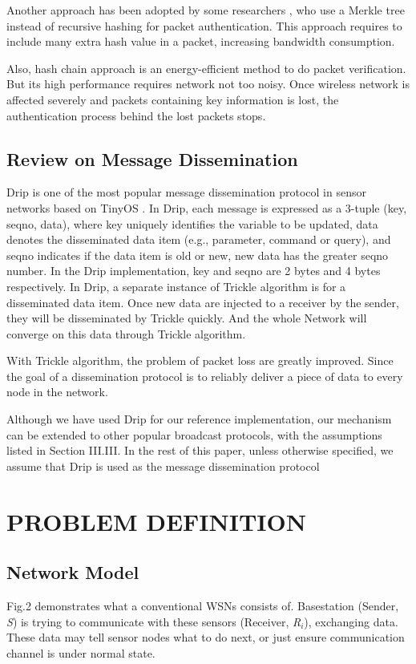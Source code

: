 \documentclass{sig-alternate-05-2015}
\begin{document}
Another approach has been adopted by some researchers \cite{hashtree} , who use a Merkle tree instead of recursive hashing for packet authentication. This approach requires to include many extra hash value in a packet, increasing bandwidth consumption.

Also, hash chain approach \cite{nested} is an energy-efficient method to do packet verification. But its high performance requires network not too noisy.  Once wireless network is affected severely and packets containing key information is lost, the authentication process behind the lost packets stops.
 
\subsection{Review on Message Dissemination}
Drip is one of the most popular message dissemination protocol in sensor networks based on TinyOS \cite{tinyos} . In Drip, each message is expressed as a 3-tuple (key, seqno, data), where key uniquely identifies the variable to be updated, data denotes the disseminated data item (e.g., parameter, command or query), and seqno indicates if the data item is old or new, new data has  the greater seqno number. In the Drip implementation, key and seqno are 2 bytes and 4 bytes respectively. In Drip, a separate instance of Trickle algorithm  \cite{trickle} is for a disseminated data item. Once new data are injected to a receiver by the sender, they will be disseminated by Trickle quickly. And the whole Network will converge on this data through Trickle algorithm. 

With Trickle algorithm, the problem of packet loss are greatly improved. Since the goal of a dissemination protocol is to reliably deliver a piece of data to every node in the network.
	
	Although we have used Drip for our reference implementation, our mechanism can be extended to other popular broadcast protocols, with the assumptions listed in Section III.III. In the rest of this paper, unless otherwise specified, we assume that Drip is used as the message dissemination protocol

\section{ PROBLEM DEFINITION}
\subsection{Network Model}	
	Fig.2 demonstrates what a conventional WSNs consists of. Basestation (Sender, \emph{S}) is trying to communicate with these sensors (Receiver, \emph{R$_i$}), exchanging data. These data may tell sensor nodes what to do next, or just ensure communication channel is under normal state.
	
\end{document}
